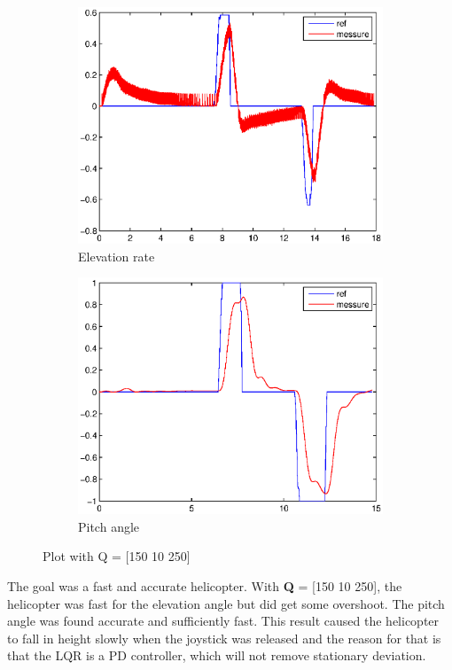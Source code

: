 \begin{figure}[H]
\graphicspath{ {Part3_pictures/}}
\begin{subfigure}{0.5\textwidth}
    \includegraphics[width=0.9\linewidth]{Part3_pictures/p3p2/Q5elevation.eps} 
    \caption{Elevation rate}
    \label{p3p2Q4e}
\end{subfigure}
\begin{subfigure}{0.5\textwidth}
    \includegraphics[width=0.9\linewidth]{Part3_pictures/p3p2/Q5pitch.eps}
    \caption{Pitch angle}
    \label{p3p2Q4p}
\end{subfigure}
\caption{Plot with Q = [150 10 250]}
\label{p3p2Q4}
\end{figure}
The goal was a fast and accurate helicopter. With \textbf{Q} = [150 10 250], the helicopter was fast for the elevation angle but did get some overshoot. The pitch angle was found accurate and sufficiently fast. This result caused the helicopter to fall in height slowly when the joystick was released and the reason for that is that the LQR is a PD controller, which will not remove stationary deviation.
